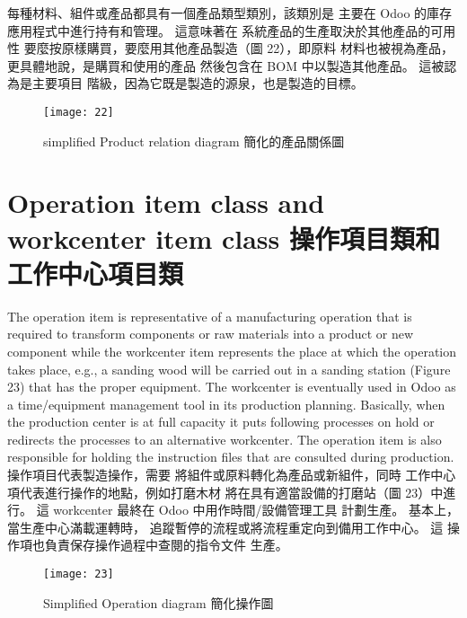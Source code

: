 \fontsize{12}{2.5pt}\sectionef  
{每種材料、組件或產品都具有一個產品類型類別，該類別是
主要在 Odoo 的庫存應用程式中進行持有和管理。 這意味著在
系統產品的生產取決於其他產品的可用性
要麼按原樣購買，要麼用其他產品製造（圖 22），即原料
材料也被視為產品，更具體地說，是購買和使用的產品
然後包含在 BOM 中以製造其他產品。 這被認為是主要項目
階級，因為它既是製造的源泉，也是製造的目標。}\\[15pt]


\begin{figure}[hbt!]
\begin{center}
\texttt{[image: 22]}
\caption{\Large  simplified Product relation diagram  簡化的產品關係圖}\label{fig.22}
\end{center}
\end{figure}


\section{Operation item class and workcenter item class 操作項目類和工作中心項目類}

\fontsize{12}{2.5pt}\sectionef 
 {The operation item is representative of a manufacturing operation that is required to
transform components or raw materials into a product or new component while the
workcenter item represents the place at which the operation takes place, e.g., a sanding wood
will be carried out in a sanding station (Figure 23) that has the proper equipment. The
workcenter is eventually used in Odoo as a time/equipment management tool in its
production planning. Basically, when the production center is at full capacity it puts
following processes on hold or redirects the processes to an alternative workcenter. The
operation item is also responsible for holding the instruction files that are consulted during
production. }\\[1pt]

\fontsize{12}{2.5pt}\sectionef  
{操作項目代表製造操作，需要
將組件或原料轉化為產品或新組件，同時
工作中心項代表進行操作的地點，例如打磨木材
將在具有適當設備的打磨站（圖 23）中進行。 這
workcenter 最終在 Odoo 中用作時間/設備管理工具
計劃生產。 基本上，當生產中心滿載運轉時，
追蹤暫停的流程或將流程重定向到備用工作中心。 這
操作項也負責保存操作過程中查閱的指令文件
生產。}\\[15pt]

\begin{figure}[hbt!]
\begin{center}
\texttt{[image: 23]}
\caption{\Large Simplified Operation diagram  簡化操作圖}\label{fig.23}
\end{center}
\end{figure}


